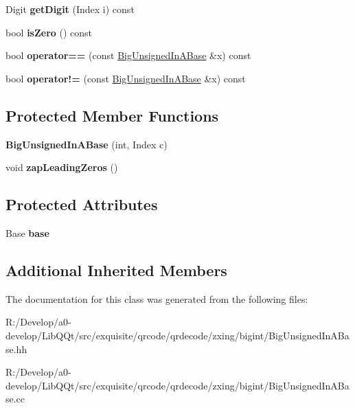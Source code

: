 \begin{DoxyCompactItemize}
Digit {\bfseries get\+Digit} (Index i) const
\item 
\mbox{\label{class_big_unsigned_in_a_base_a0333e61e3347ea7dd5a24a148d218ec5}} 
bool {\bfseries is\+Zero} () const
\item 
\mbox{\label{class_big_unsigned_in_a_base_ace96e86a0c91a3058132766ac6e7ffb2}} 
bool {\bfseries operator==} (const \mbox{\hyperlink{class_big_unsigned_in_a_base}{Big\+Unsigned\+In\+A\+Base}} \&x) const
\item 
\mbox{\label{class_big_unsigned_in_a_base_af217a437fb4e8b01ea54833397e12a6e}} 
bool {\bfseries operator!=} (const \mbox{\hyperlink{class_big_unsigned_in_a_base}{Big\+Unsigned\+In\+A\+Base}} \&x) const
\end{DoxyCompactItemize}
\subsection*{Protected Member Functions}
\begin{DoxyCompactItemize}
\item 
\mbox{\label{class_big_unsigned_in_a_base_a48d1d72385b3e74e11a3ba94ad71a154}} 
{\bfseries Big\+Unsigned\+In\+A\+Base} (int, Index c)
\item 
\mbox{\label{class_big_unsigned_in_a_base_a93d3365a8ce12915d186e086da351848}} 
void {\bfseries zap\+Leading\+Zeros} ()
\end{DoxyCompactItemize}
\subsection*{Protected Attributes}
\begin{DoxyCompactItemize}
\item 
\mbox{\label{class_big_unsigned_in_a_base_ae681463e5308aec2ff172e55fa881f0e}} 
Base {\bfseries base}
\end{DoxyCompactItemize}
\subsection*{Additional Inherited Members}


The documentation for this class was generated from the following files\+:\begin{DoxyCompactItemize}
\item 
R\+:/\+Develop/a0-\/develop/\+Lib\+Q\+Qt/src/exquisite/qrcode/qrdecode/zxing/bigint/Big\+Unsigned\+In\+A\+Base.\+hh\item 
R\+:/\+Develop/a0-\/develop/\+Lib\+Q\+Qt/src/exquisite/qrcode/qrdecode/zxing/bigint/Big\+Unsigned\+In\+A\+Base.\+cc\end{DoxyCompactItemize}
